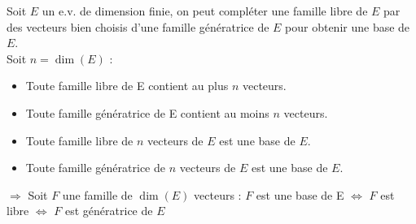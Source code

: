     Soit $E$ un e.v. de dimension finie, on peut compléter une famille libre de $E$ par des vecteurs bien choisis d'une famille génératrice de $E$ pour obtenir une base de $E$.\\
    
    \newpage
    Soit $n = \dim(E)$ :
    \begin{itemize}
      \item Toute famille libre de E contient au plus $n$ vecteurs.
      \item Toute famille génératrice de E contient au moins $n$ vecteurs.
      \item Toute famille libre de $n$ vecteurs de $E$ est une base de $E$.
      \item Toute famille génératrice de $n$ vecteurs de $E$ est une base de $E$.
    \end{itemize}
    $\Rightarrow$ Soit $F$ une famille de $\dim(E)$ vecteurs : $F$ est une base de E $\iff$ $F$ est libre $\iff$ $F$ est génératrice de $E$\\
    
  
